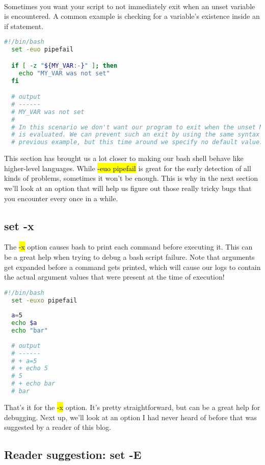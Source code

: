 \documentclass[a4paper]{article}
\begin{document}
\begin{itemize}
  \paragraph{}
  Sometimes you want your script to not immediately exit when an unset variable is encountered. A common example is checking for a variable’s existence inside an if statement.
  \begin{lstlisting}[language=Bash]
  #!/bin/bash
  set -euo pipefail

  if [ -z "${MY_VAR:-}" ]; then
    echo "MY_VAR was not set"
  fi

  # output
  # ------
  # MY_VAR was not set
  #
  # In this scenario we don't want our program to exit when the unset MY_VAR variable
  # is evaluated. We can prevent such an exit by using the same syntax as we did in the
  # previous example, but this time around we specify no default value.
  \end{lstlisting}
\end{itemize}
  This section has brought us a lot closer to making our bash shell behave like higher-level languages. 
  While \hl{-euo pipefail} is great for the early detection of all kinds of problems, sometimes it won’t be enough. 
  This is why in the next section we’ll look at an option that will help us figure out those really tricky bugs that you encounter every once in a while.
  

\subsection{set -x}
The \hl{-x} option causes bash to print each command before executing it. 
This can be a great help when trying to debug a bash script failure. 
Note that arguments get expanded before a command gets printed, which will cause our logs to contain the actual argument values that were present at the time of execution!
\begin{lstlisting}[language=Bash]
  #!/bin/bash
  set -euxo pipefail
  
  a=5
  echo $a
  echo "bar"
  
  # output
  # ------
  # + a=5
  # + echo 5
  # 5
  # + echo bar
  # bar  
\end{lstlisting}

That’s it for the \hl{-x} option. It’s pretty straightforward, but can be a great help for debugging. Next up, we’ll look at an option I had never heard of before that was suggested by a reader of this blog.

\subsection{Reader suggestion: set -E}
\end{document}
